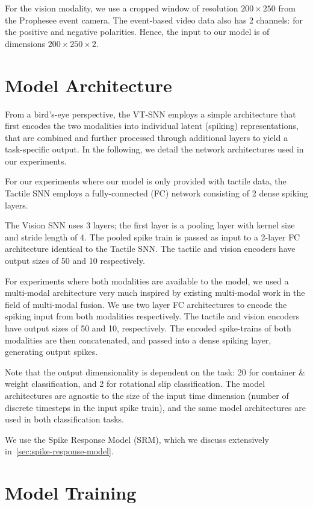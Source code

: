 \documentclass[fyp]{socreport}
\begin{document}
For the vision modality, we use a cropped window of resolution $200 \times 250$
from the Prophesee event camera. The event-based video data also has 2 channels:
for the positive and negative polarities. Hence, the input to our model is of
dimensions $200 \times 250 \times 2$.

\section{Model Architecture}

From a bird's-eye perspective, the VT-SNN employs a simple architecture that
first encodes the two modalities into individual latent (spiking)
representations, that are combined and further processed through additional
layers to yield a task-specific output. In the following, we detail the network
architectures used in our experiments.

For our experiments where our model is only provided with tactile data, the
Tactile SNN employs a fully-connected (FC) network consisting of 2 dense spiking
layers.

The Vision SNN uses 3 layers; the first layer is a pooling layer with kernel
size and stride length of 4. The pooled spike train is passed as input to a
2-layer FC architecture identical to the Tactile SNN. The tactile and vision
encoders have output sizes of 50 and 10 respectively.

For experiments where both modalities are available to the model, we used a
multi-modal architecture very much inspired by existing multi-modal work in
the field of multi-modal fusion. We use two layer FC architectures to encode the
spiking input from both modalities respectively. The tactile and vision encoders
have output sizes of 50 and 10, respectively. The encoded spike-trains of both
modalities are then concatenated, and passed into a dense spiking layer,
generating output spikes.

Note that the output dimensionality is dependent on the task: 20 for container \&
weight classification, and 2 for rotational slip classification. The model
architectures are agnostic to the size of the input time dimension (number of
discrete timesteps in the input spike train), and the same model architectures
are used in both classification tasks.

We use the Spike Response Model (SRM), which we discuss extensively
in~\autoref{sec:spike-response-model}.

\section{Model Training}
\end{document}
